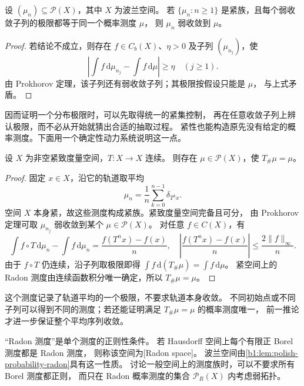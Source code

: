 \begin{corollary}\label{b1:cor:tight-unique-limit}
设 \((\mu_n)\subseteq\mathcal P(X)\)，其中 \(X\) 为波兰空间。
若 \(\{\mu_n:n\geq1\}\) 是紧族，且每个弱收敛子列的极限都等于同一个概率测度 \(\mu\)，
则 \(\mu_n\) 弱收敛到 \(\mu\)。
\end{corollary}
\begin{proof}
若结论不成立，则存在 \(f\in C_b(X)\)、\(\eta>0\) 及子列 \((\mu_{n_j})\)，使
\[
 \left|\int f\,\mathrm{d}\mu_{n_j}-\int f\,\mathrm{d}\mu\right|\geq\eta
 \quad(j\geq1).
\]
由 Prokhorov 定理，该子列还有弱收敛子列；其极限按假设只能是 \(\mu\)，
与上式矛盾。
\end{proof}

因而证明一个分布极限时，可以先取得统一的紧集控制，
再在任意收敛子列上辨认极限，而不必从开始就猜出合适的抽取过程。
紧性也能构造原先没有给定的概率测度。下面用一个确定性动力系统说明这一点。

\begin{proposition}\label{b1:prop:compact-invariant-probability}
设 \(X\) 为非空紧致度量空间，\(T:X\rightarrow X\) 连续。
则存在 \(\mu\in\mathcal P(X)\)，使 \(T_\#\mu=\mu\)。
\end{proposition}
\begin{proof}
固定 \(x\in X\)，沿它的轨道取平均
\[
 \mu_n=\frac1n\sum_{k=0}^{n-1}\delta_{T^kx}.
\]
空间 \(X\) 本身紧，故这些测度构成紧族。紧致度量空间完备且可分，
由 Prokhorov 定理可取 \(\mu_{n_j}\) 弱收敛到某个 \(\mu\in\mathcal P(X)\)。
对任意 \(f\in C(X)\)，有
\[
 \int f\circ T\,\mathrm{d}\mu_n-\int f\,\mathrm{d}\mu_n
 =\frac{f(T^nx)-f(x)}n,
 \quad
 \left|\frac{f(T^nx)-f(x)}n\right|\leq\frac{2\|f\|_\infty}{n}.
\]
由于 \(f\circ T\) 仍连续，沿子列取极限即得
\(\int f\,\mathrm{d}(T_\#\mu)=\int f\,\mathrm{d}\mu\)。
紧空间上的 Radon 测度由连续函数积分唯一确定，所以 \(T_\#\mu=\mu\)。
\end{proof}

这个测度记录了轨道平均的一个极限，不要求轨道本身收敛。
不同初始点或不同子列可以得到不同的测度；若还能证明满足 \(T_\#\mu=\mu\) 的概率测度唯一，
前一推论才进一步保证整个平均序列收敛。


“Radon 测度”是单个测度的正则性条件。
若 Hausdorff 空间上每个有限正 Borel 测度都是 Radon 测度，
则称该空间为[Radon space]。
波兰空间由\cref{b1:lem:polish-probability-radon}具有这一性质。
讨论一般空间上的测度族时，可以不要求所有 Borel 测度都正则，
而只在 Radon 概率测度的集合 \(\mathcal P_R(X)\) 内考虑弱拓扑。

